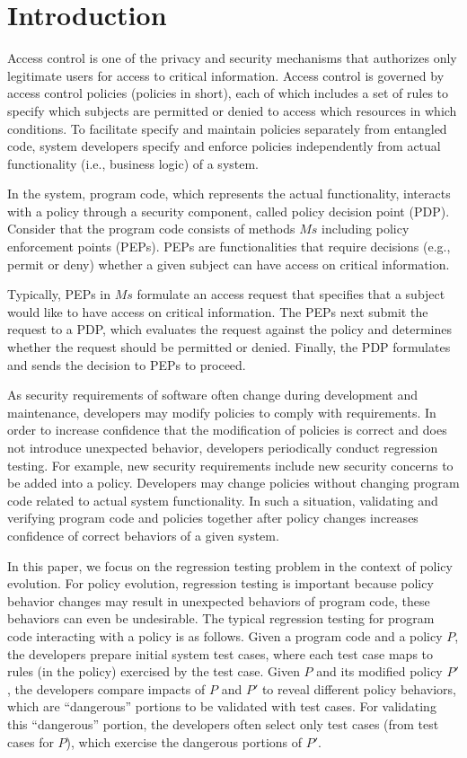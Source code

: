 \section{Introduction} \label{sec:introduction}
 
Access control is one of the privacy and security mechanisms that authorizes only legitimate users for access to critical information. 
Access control is governed by access control policies (policies in short), each of which includes a set of rules to specify 
which subjects are permitted or denied to access which resources in which conditions. To facilitate specify and maintain policies separately from entangled code, 
system developers specify and enforce policies independently from actual functionality (i.e., business logic) of a system.

In the system, program code, which represents the actual functionality,
interacts with a policy through a security component, called policy decision point (PDP).
Consider that the program code consists of methods $Ms$ including policy enforcement points (PEPs).
PEPs are functionalities that require decisions (e.g., permit or deny) whether a given subject can have access on critical information.

Typically, PEPs in $Ms$ formulate an access request that specifies that a subject would like to have access on 
critical information. The PEPs next submit the request to a PDP, which evaluates the request against the policy
and determines whether the request should be permitted or denied. Finally, the PDP formulates and sends the
decision to PEPs to proceed.

As security requirements of software often change during development and maintenance,
developers may modify policies to comply with requirements. In order to increase confidence that the modification of policies is correct and
does not introduce unexpected behavior, developers periodically conduct regression testing.
For example, new security requirements include new security concerns to be added into a policy.
Developers may change policies without changing program code related to actual system functionality.
In such a situation, validating and verifying program code and policies together after policy changes
increases confidence of correct behaviors of a given system.


In this paper, we focus on the regression testing problem in the context of policy evolution.
For policy evolution, regression testing is important because policy behavior changes may
result in unexpected behaviors of program code, these behaviors can even be undesirable.
The typical regression testing for program code interacting with a policy is as follows.
Given a program code and a policy $P$, the developers prepare initial system test cases, where
each test case maps to rules (in the policy) exercised by the test case. Given $P$ and its modified
policy $P'$, the developers compare impacts of $P$ and $P'$ to
reveal different policy behaviors, which are ``dangerous'' portions to be validated with
test cases. For validating this ``dangerous'' portion, the developers often select only test cases (from test cases for $P$), which exercise the dangerous
portions of $P'$.


